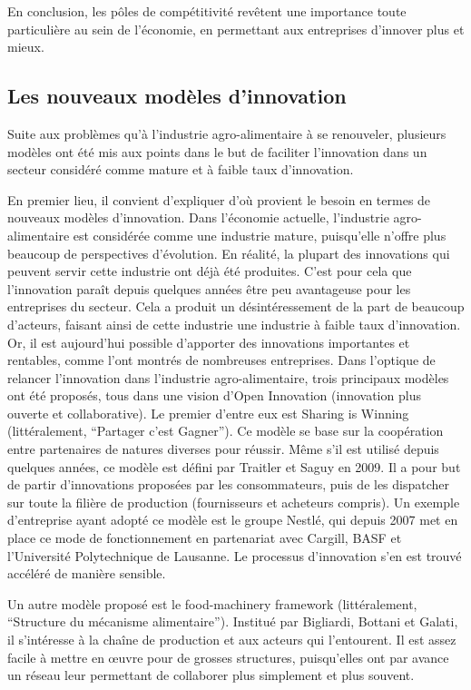 \documentclass[a4paper,10pt]{report}
\begin{document}
		En conclusion, les pôles de compétitivité revêtent une importance toute particulière au sein de l’économie, en permettant aux entreprises d’innover plus et mieux.
				
		\subsection{Les nouveaux modèles d’innovation}
			Suite aux problèmes qu’à l’industrie agro-alimentaire à se renouveler, plusieurs modèles ont été mis aux points dans le but de faciliter l’innovation dans un secteur considéré comme mature et à faible taux d’innovation.
			
			En premier lieu, il convient d’expliquer d’où provient le besoin en termes de nouveaux modèles d’innovation. Dans l’économie actuelle, l’industrie agro-alimentaire est considérée comme une industrie mature, puisqu’elle n’offre plus beaucoup de perspectives d’évolution. En réalité, la plupart des innovations qui peuvent servir cette industrie ont déjà été produites. C’est pour cela que l’innovation paraît depuis quelques années être peu avantageuse pour les entreprises du secteur. Cela a produit un désintéressement de la part de beaucoup d’acteurs, faisant ainsi de cette industrie une industrie à faible taux d’innovation. Or, il est aujourd’hui possible d’apporter des innovations importantes et rentables, comme l’ont montrés de nombreuses entreprises.
			Dans l’optique de relancer l’innovation dans l’industrie agro-alimentaire, trois principaux modèles ont été proposés, tous dans une vision d’Open Innovation (innovation plus ouverte et collaborative). Le premier d’entre eux est Sharing is Winning (littéralement, “Partager c’est Gagner”). Ce modèle se base sur la coopération entre partenaires de natures diverses pour réussir. Même s’il est utilisé depuis quelques années, ce modèle est défini par Traitler et Saguy en 2009. Il a pour but de partir d’innovations proposées par les consommateurs, puis de les dispatcher sur toute la filière de production (fournisseurs et acheteurs compris). Un exemple d’entreprise ayant adopté ce modèle est le groupe Nestlé, qui depuis 2007 met en place ce mode de fonctionnement en partenariat avec Cargill, BASF et l'Université Polytechnique de Lausanne. Le processus d’innovation s’en est trouvé accéléré de manière sensible.	
			
			Un autre modèle proposé est le food-machinery framework (littéralement, “Structure du mécanisme alimentaire”). Institué par Bigliardi, Bottani et Galati, il s’intéresse à la chaîne de production et aux acteurs qui l’entourent. Il est assez facile à mettre en œuvre pour de grosses structures, puisqu’elles ont par avance un réseau leur permettant de collaborer plus simplement et plus souvent.
			
\end{document}
